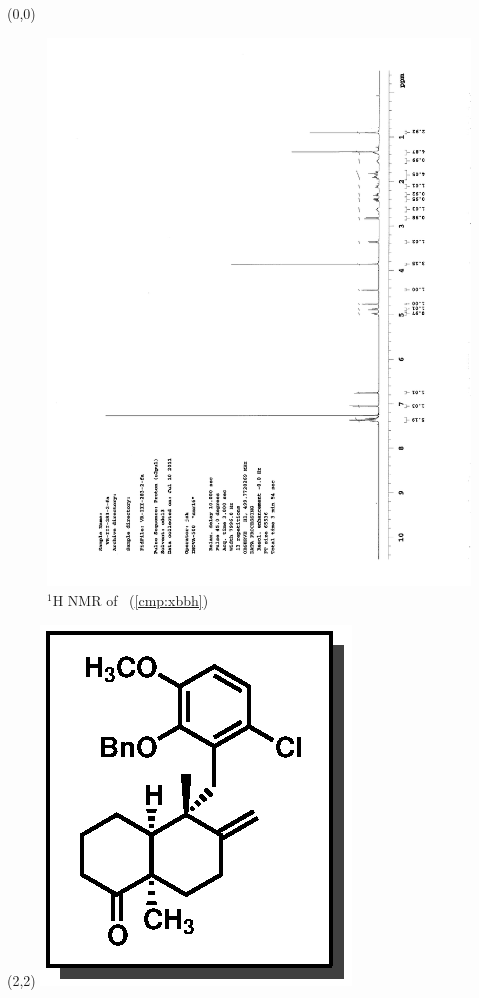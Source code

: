 \begin{textblock}{20}(0,0)
\begin{figure}[htb]
\caption{$^1$H NMR of \CMPxbbh\ (\ref{cmp:xbbh})}
\includegraphics[scale=0.75, trim = 0mm 0mm 0mm 5mm,
clip]{chp_singlecarbon/images/nmr/xbbhH}
\vspace{-100pt}
\end{figure}
\end{textblock}
\begin{textblock}{1}(2,2)
\includegraphics[scale=0.8, angle=90]{chp_singlecarbon/images/xbbh}
\end{textblock}
